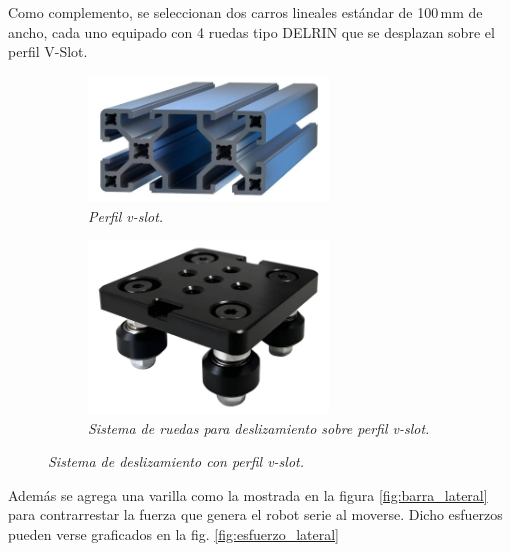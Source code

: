 Como complemento, se seleccionan dos carros lineales estándar de 100\,mm de ancho, cada uno equipado con 4 ruedas tipo DELRIN que se desplazan sobre el perfil V-Slot.
\begin{figure}[H]
    \centering
    \begin{subfigure}{0.35\textwidth}
        \centering
        \includegraphics[width=0.7\textwidth]{img/vslot_40x80.png}
        \caption{\textit{Perfil v-slot.}}
        \label{fig:vslot_40x80}
    \end{subfigure}
    \hspace{0.5cm}
    \begin{subfigure}{0.35\textwidth}
        \centering
        \includegraphics[width=0.7\textwidth]{img/carro_perfilvslot.png}
        \caption{\textit{Sistema de ruedas para deslizamiento sobre perfil v-slot.}}
        \label{fig:carro_perfilvslot}
    \end{subfigure}
    \caption{\textit{Sistema de deslizamiento con perfil v-slot.}}
\end{figure}
Además se agrega una varilla como la mostrada en la figura \ref{fig:barra_lateral} para contrarrestar la fuerza que genera el robot serie al moverse. Dicho esfuerzos pueden verse graficados en la fig. \ref{fig:esfuerzo_lateral}

